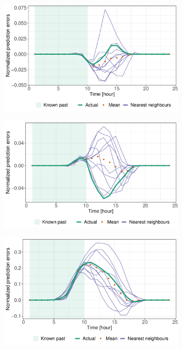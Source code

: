 \documentclass[12pt]{report}
\begin{document}
\begin{figure}[h] 
	\begin{subfigure}[b]{0.5\linewidth}
		\centering
		\includegraphics[width=1\linewidth]{Images/PV/KNN/NN_intraday_testdata_11.pdf} 
	\end{subfigure}%
	\begin{subfigure}[b]{0.5\linewidth}
		\centering
		\includegraphics[width=1\linewidth]{Images/PV/KNN/NN_intraday_testdata_48.pdf} 
	\end{subfigure}
	\centering
	\begin{subfigure}[b]{0.5\linewidth}
		\centering
		\includegraphics[width=1\linewidth]{Images/PV/KNN/NN_intraday_testdata_99.pdf} 

\end{subfigure}
\end{figure}
\end{document}
